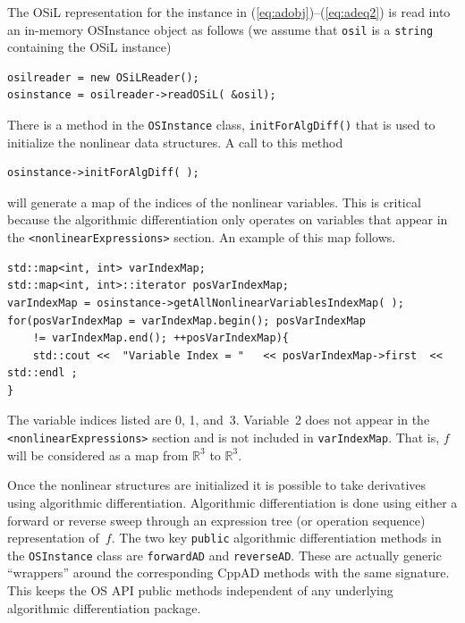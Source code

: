 \documentclass[11pt]{article}
\renewcommand{\_}{{\char"5F}}
\renewcommand{\{}{{\char"7B}}
\renewcommand{\}}{{\char"7D}}
\renewcommand{\^}{{\char"0D}}
\renewcommand{\'}{{\char"0D}}
\begin{document}
\begin{enumerate}[Step 1:]
The OSiL representation for the instance  in  (\ref{eq:adobj})--(\ref{eq:adeq2})  is read into an in-memory 
OSInstance object as follows (we assume that {\tt osil} is a {\tt string} containing the OSiL instance)
\begin{verbatim}
osilreader = new OSiLReader();
osinstance = osilreader->readOSiL( &osil);
\end{verbatim}
There is a method in the {\tt OSInstance} class, {\tt initForAlgDiff()} that is used to initialize the nonlinear data structures.  A call to this method
\begin{verbatim}
osinstance->initForAlgDiff( );
\end{verbatim}
will generate a map of the indices of the nonlinear variables. This is critical because the algorithmic differentiation only operates on variables that appear in the {\tt <nonlinearExpressions>} section.  An example of this map follows.
\begin{verbatim}
std::map<int, int> varIndexMap;
std::map<int, int>::iterator posVarIndexMap;
varIndexMap = osinstance->getAllNonlinearVariablesIndexMap( );
for(posVarIndexMap = varIndexMap.begin(); posVarIndexMap
    != varIndexMap.end(); ++posVarIndexMap){
    std::cout <<  "Variable Index = "   << posVarIndexMap->first  << std::endl ;
}
\end{verbatim}
The variable indices listed are 0, 1, and~3. Variable~2 does not appear in the {\tt <nonlinearExpressions>} section and 
is not included in {\tt varIndexMap}. That is, $f$ will be considered as a map from $ \mathbb{R}^{3}$ to $ \mathbb{R}^{3}$.

Once the nonlinear structures are initialized it is possible to take derivatives using algorithmic differentiation.   
Algorithmic differentiation is done using either a forward or reverse sweep through an expression tree (or operation 
sequence) representation of~$f$.  The two key {\tt public} algorithmic differentiation  methods in the {\tt OSInstance}%
 class are {\tt forwardAD} and {\tt reverseAD}.   
These are actually  generic ``wrappers'' around the corresponding CppAD methods with the same signature.  
This keeps the OS API  public methods independent of any underlying algorithmic differentiation package.


\end{enumerate}
\end{document}
